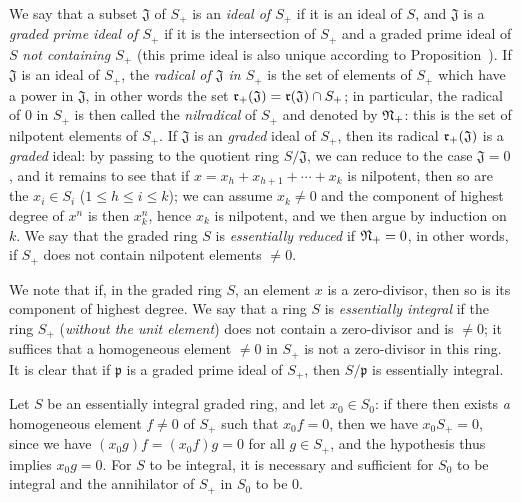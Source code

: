 \begin{env}[2.1.10]
\label{II.2.1.10}
We say that a subset $\mathfrak{J}$ of $S_+$ is an \emph{ideal of $S_+$} if it is an ideal of $S$, and $\mathfrak{J}$ is a \emph{graded prime ideal of $S_+$} if it is the intersection of $S_+$ and a graded prime ideal of $S$ \emph{not containing $S_+$} (this prime ideal is also unique according to Proposition~).
If $\mathfrak{J}$ is an ideal of $S_+$, the \emph{radical of $\mathfrak{J}$ in $S_+$} is the set of elements of $S_+$ which have a power in $\mathfrak{J}$, in other words the set $\mathfrak{r}_+(\mathfrak{J})=\mathfrak{r}(\mathfrak{J})\cap S_+$;
in particular, the radical of $0$ in $S_+$ is then called the \emph{nilradical} of $S_+$ and denoted by $\mathfrak{N}_+$: this is the set of nilpotent elements of $S_+$.
If $\mathfrak{J}$ is an \emph{graded} ideal of $S_+$, then its radical $\mathfrak{r}_+(\mathfrak{J})$ is a \emph{graded} ideal: by passing to the quotient ring $S/\mathfrak{J}$, we can reduce to the case $\mathfrak{J}=0$, and it remains to see that if $x=x_h+x_{h+1}+\cdots+x_k$ is nilpotent, then so are the $x_i\in S_i$ ($1\leq h\leq i\leq k$);
we can assume $x_k\neq 0$ and the component of highest degree of $x^n$ is then $x_k^n$, hence $x_k$ is nilpotent, and we then argue by induction on $k$.
We say that the graded ring $S$ is \emph{essentially reduced} if $\mathfrak{N}_+=0$, in other words, if $S_+$ does not contain nilpotent elements $\neq 0$.
\end{env}

\begin{env}[2.1.11]
\label{II.2.1.11}
We note that if, in the graded ring $S$, an element $x$ is a zero-divisor, then so is its component of highest degree.
We say that a ring $S$ is \emph{essentially integral} if the ring $S_+$ (\emph{without the unit element}) does not contain a zero-divisor and is $\neq 0$;
it suffices that a homogeneous element $\neq 0$ in $S_+$ is not a zero-divisor in this ring.
It is clear that if $\mathfrak{p}$ is a graded prime ideal of $S_+$, then $S/\mathfrak{p}$ is essentially integral.

Let $S$ be an essentially integral graded ring, and let $x_0\in S_0$:
if there then exists \emph{a} homogeneous element $f\neq 0$ of $S_+$ such that $x_0 f=0$, then we have $x_0 S_+=0$, since we have $(x_0 g)f=(x_0 f)g=0$ for all $g\in S_+$, and the hypothesis thus implies $x_0 g=0$.
For $S$ to be integral, it is necessary and sufficient for $S_0$ to be integral and the annihilator of $S_+$ in $S_0$ to be $0$.
\end{env}

